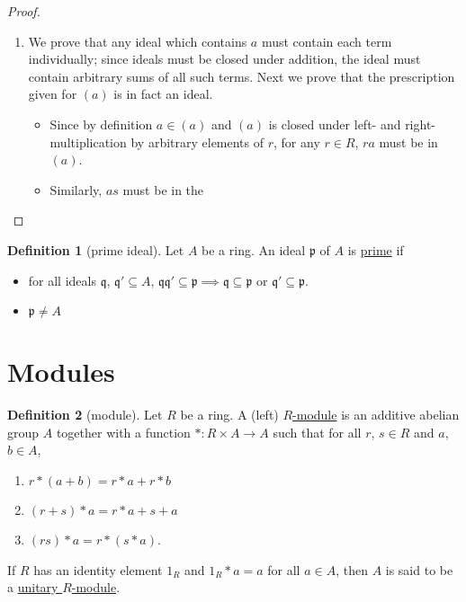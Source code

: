 \documentclass[a4paper,10pt]{scrreprt}
\newcommand{\defn}[1]{\ul{#1}}
\theoremstyle{definition}
\newtheorem{definition}{Definition}[section]
\theoremstyle{plain}
\theoremstyle{remark}
\begin{document}
\begin{proof}
  $\,$
  \begin{enumerate}
    \item We prove that any ideal which contains $a$ must contain each term individually; since ideals must be closed under addition, the ideal must contain arbitrary sums of all such terms. Next we prove that the prescription given for $(a)$ is in fact an ideal.
      \begin{itemize}
        \item Since by definition $a \in (a)$ and $(a)$ is closed under left- and right-multiplication by arbitrary elements of $r$, for any $r \in R$, $ra$ must be in $(a)$.
        \item Similarly, $as$ must be in the
      \end{itemize}
  \end{enumerate}
\end{proof}
\begin{definition}[prime ideal]
  \label{def:primeideal}
  Let $A$ be a ring. An ideal $\mathfrak{p}$ of $A$ is \defn{prime} if
  \begin{itemize}
    \item for all ideals $\mathfrak{q}$, $\mathfrak{q}' \subseteq A$, $\mathfrak{q}\mathfrak{q}' \subseteq \mathfrak{p} \implies \mathfrak{q} \subseteq \mathfrak{p}$ or $\mathfrak{q}' \subseteq \mathfrak{p}$.

    \item $\mathfrak{p} \neq A$
  \end{itemize}
\end{definition}

\section{Modules}
\begin{definition}[module]
  \label{def:module}
  Let $R$ be a ring. A (left) \defn{$R$-module} is an additive abelian group $A$ together with a function $*\colon R \times A \to A$ such that for all $r$, $s \in R$ and $a$, $b \in A$,
  \begin{enumerate}
    \item $r*(a+b) = r*a + r*b$
    \item $(r+s)*a = r*a + s+a$
    \item $(rs)*a = r*(s*a)$.
  \end{enumerate}
  If $R$ has an identity element $1_{R}$ and $1_{R}*a = a$ for all $a \in A$, then $A$ is said to be a \defn{unitary $R$-module}.
\end{definition}
\end{document}
